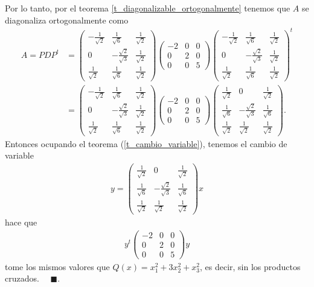 \documentclass[11pt,letterpaper]{article}
\newcommand{\fin}{$\blacksquare.$}
\begin{document}
\begin{enumerate}
Por lo tanto, por el teorema \ref{t_diagonalizable_ortogonalmente} tenemos que $A$ se diagonaliza ortogonalmente como
\begin{align*}
A=PDP^{t}&= \begin{pmatrix}
-\frac{1}{\sqrt{2}}&\frac{1}{\sqrt{6}}&\frac{1}{\sqrt{2}} \\
0 & -\frac{\sqrt{2}}{\sqrt{3}} & \frac{1}{\sqrt{2}}\\
\frac{1}{\sqrt{2}} & \frac{1}{\sqrt{6}} & \frac{1}{\sqrt{2}}
\end{pmatrix} \left(\begin{matrix}
-2 & 0 & 0 \\
0 & 2 & 0 \\
0 & 0 & 5
\end{matrix}\right)\begin{pmatrix}
-\frac{1}{\sqrt{2}}&\frac{1}{\sqrt{6}}&\frac{1}{\sqrt{2}} \\
0 & -\frac{\sqrt{2}}{\sqrt{3}} & \frac{1}{\sqrt{2}}\\
\frac{1}{\sqrt{2}} & \frac{1}{\sqrt{6}} & \frac{1}{\sqrt{2}}
\end{pmatrix}^t\\
&=\begin{pmatrix}
-\frac{1}{\sqrt{2}}&\frac{1}{\sqrt{6}}&\frac{1}{\sqrt{2}} \\
0 & -\frac{\sqrt{2}}{\sqrt{3}} & \frac{1}{\sqrt{2}}\\
\frac{1}{\sqrt{2}} & \frac{1}{\sqrt{6}} & \frac{1}{\sqrt{2}}
\end{pmatrix}\left(\begin{matrix}
-2 & 0 & 0 \\
0 & 2 & 0 \\
0 & 0 & 5
\end{matrix}\right)
\begin{pmatrix}
\frac{1}{\sqrt{2}} & 0 & \frac{1}{\sqrt{2}}\\
\frac{1}{\sqrt{6}} & -\frac{\sqrt{2}}{\sqrt{3}} & \frac{1}{\sqrt{6}}\\
\frac{1}{\sqrt{2}} & \frac{1}{\sqrt{2}} & \frac{1}{\sqrt{2}}
\end{pmatrix}.
\end{align*}
Entonces ocupando el teorema (\ref{t_cambio_variable}), tenemos el cambio de variable
\begin{align*}
y =\begin{pmatrix}
\frac{1}{\sqrt{2}} & 0 & \frac{1}{\sqrt{2}}\\
\frac{1}{\sqrt{6}} & -\frac{\sqrt{2}}{\sqrt{3}} & \frac{1}{\sqrt{6}}\\
\frac{1}{\sqrt{2}} & \frac{1}{\sqrt{2}} & \frac{1}{\sqrt{2}}
\end{pmatrix} x
\end{align*}
hace que 
\begin{align*}
y^t\left(\begin{matrix}
-2 & 0 & 0 \\
0 & 2 & 0 \\
0 & 0 & 5
\end{matrix}\right) y 
\end{align*}
tome los mismos valores que $Q(x)=x_1^2+3x_2^2+x_3^2$, es decir, sin los productos cruzados. \ \ \fin


\end{enumerate}
\end{document}
